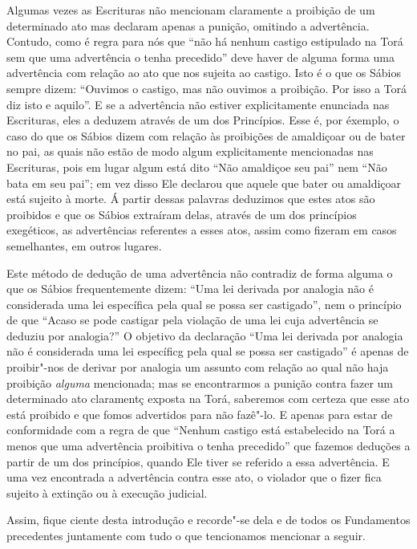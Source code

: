 Algumas vezes as Escrituras não mencionam claramente a proibição de um
determinado ato mas declaram apenas a punição, omitindo a advertência.
Contudo, como é regra para nós que ``não há nenhum castigo estipulado na
Torá\starr{} sem que uma advertência o tenha precedido'' deve haver de alguma
forma uma advertência com relação ao ato que nos sujeita ao castigo.
Isto é o que os Sábios sempre dizem: ``Ouvimos o castigo, mas não
ouvimos a proibição. Por isso a Torá\starr{} diz isto e aquilo''. E se a
advertência não estiver explicitamente enunciada nas Escrituras, eles a
deduzem através de um dos Princípios. Esse é, por éxemplo, o caso do que
os Sábios dizem com relação às proibições de amaldiçoar ou de bater no
pai, as quais não estão de modo algum explicitamente mencionadas nas
Escrituras, pois em lugar algum está dito ``Não amaldiçoe seu pai'' nem
``Não bata em seu pai''; em vez disso Ele declarou que aquele que bater
ou amaldiçoar está sujeito à morte. Á partir dessas palavras deduzimos
que estes atos são proibidos e que os Sábios extraíram delas, através de
um dos princípios exegéticos, as advertências referentes a esses atos,
assim como fizeram em casos semelhantes, em outros lugares.

Este método de dedução de uma advertência não contradiz de forma alguma
o que os Sábios frequentemente dizem: ``Uma lei derivada por analogia
não é considerada uma lei específica pela qual se possa ser castigado'',
nem o princípio de que ``Acaso se pode castigar pela violação de uma lei
cuja advertência se deduziu por analogia?'' O objetivo da declaração
``Uma lei derivada por analogia não é considerada uma lei específicg
pela qual se possa ser castigado'' é apenas de proibir"-nos de derivar
por analogia um assunto com relação ao qual não haja proibição
\emph{alguma} mencionada; mas se encontrarmos a punição contra fazer um
determinado ato claramentç exposta na Torá\starr, saberemos com certeza que
esse ato está proibido e que fomos advertidos para não fazê"-lo. E apenas
para estar de conformidade com a regra de que ``Nenhum castigo está
estabelecido na Torá\starr{} a menos que uma advertência proibitiva o tenha
precedido'' que fazemos deduções a partir de um dos princípios, quando
Ele tiver se referido a essa advertência. E uma vez encontrada a
advertência contra esse ato, o violador que o fizer fica sujeito à
extinção ou à execução judicial.

Assim, fique ciente desta introdução e recorde"-se dela e de todos os
Fundamentos precedentes juntamente com tudo o que tencionamos mencionar
a seguir.

